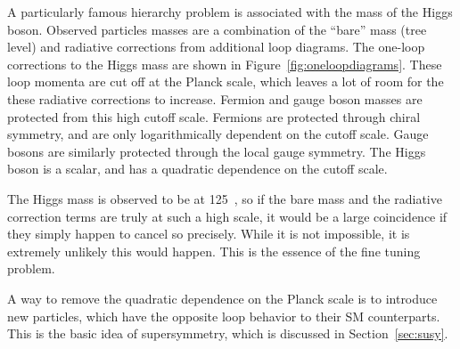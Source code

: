 A particularly famous hierarchy problem is associated with the mass of the
Higgs boson.
Observed particles masses are a combination of the ``bare'' mass (tree level)
and radiative corrections from additional loop diagrams.
The one-loop corrections to the Higgs mass are shown in
Figure~\ref{fig:oneloopdiagrams}.
These loop momenta are cut off at the Planck scale, which leaves a lot of room
for the these radiative corrections to increase.
Fermion and gauge boson masses are protected from this high cutoff scale.
Fermions are protected through chiral symmetry, and are only logarithmically
dependent on the cutoff scale. 
Gauge bosons are similarly protected through the local gauge symmetry.
The Higgs boson is a scalar, and has a quadratic dependence on the cutoff
scale.

The Higgs mass is observed to be at 125~\GeV, so if the bare mass and the
radiative correction terms are truly at such a high scale, it would be a large
coincidence if they simply happen to cancel so precisely.
While it is not impossible, it is extremely unlikely this would happen.
This is the essence of the fine tuning problem.

A way to remove the quadratic dependence on the Planck scale is to introduce
new particles, which have the opposite loop behavior to their SM counterparts.
This is the basic idea of supersymmetry, which is discussed in
Section~\ref{sec:susy}.

